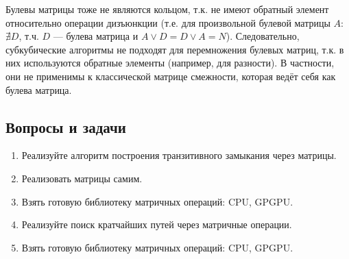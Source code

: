 Булевы матрицы тоже не являются кольцом, т.к. не имеют обратный элемент относительно операции дизъюнкции (т.е. для произвольной булевой матрицы $A$: $\nexists D$, т.ч. $D$ --- булева матрица и $A \vee D = D \vee A = N$). Следовательно, субкубические алгоритмы не подходят для перемножения булевых матриц, т.к. в них используются обратные элементы (например, для разности). В частности, они не применимы к классической матрице смежности, которая ведёт себя как булева матрица.

\subsection{Вопросы и задачи}
\begin{enumerate}
  \item Реализуйте алгоритм построения транзитивного замыкания через матрицы.
  \item Реализовать матрицы самим.
  \item Взять готовую библиотеку матричных операций: CPU, GPGPU.
  \item Реализуйте поиск кратчайших путей через матричные операции.
  \item Взять готовую библиотеку матричных операций: CPU, GPGPU.
\end{enumerate}